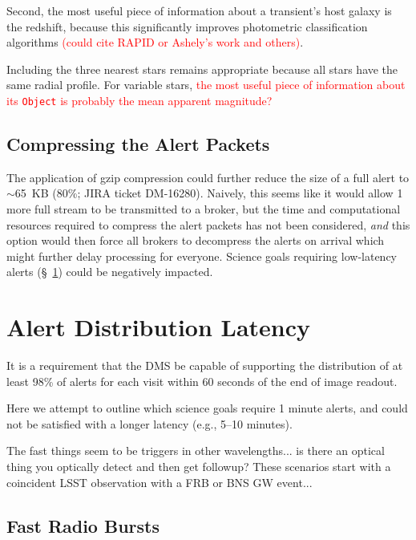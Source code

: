 \documentclass[DM,lsstdraft,authoryear,toc]{lsstdoc}
\begin{document}
Second, the most useful piece of information about a transient's host galaxy is the redshift, because this significantly improves photometric classification algorithms \textcolor{red}{(could cite RAPID or Ashely's work and others)}. 

Including the three nearest stars remains appropriate because all stars have the same radial profile. For variable stars, \textcolor{red}{the most useful piece of information about its {\tt Object} is probably the mean apparent magnitude?}


\subsection{Compressing the Alert Packets}\label{ssec:packets_compress}

The application of gzip compression could further reduce the size of a full alert to $\sim$65~KB (80\%; JIRA ticket DM-16280). Naively, this seems like it would allow 1 more full stream to be transmitted to a broker, but the time and computational resources required to compress the alert packets has not been considered, \emph{and} this option would then force all brokers to decompress the alerts on arrival which might further delay processing for everyone. Science goals requiring low-latency alerts (\S~\ref{sec:latency}) could be negatively impacted.


\section{Alert Distribution Latency} \label{sec:latency}

It is a requirement that the DMS be capable of supporting the distribution of at least 98\% of alerts for each visit within 60 seconds of the end of image readout.

Here we attempt to outline which science goals require 1 minute alerts, and could not be satisfied with a longer latency (e.g., 5--10 minutes).


The fast things seem to be triggers in other wavelengths... is there an optical thing you optically detect and then get followup? These scenarios start with a coincident LSST observation with a FRB or BNS GW event...

\subsection{Fast Radio Bursts}
\end{document}

